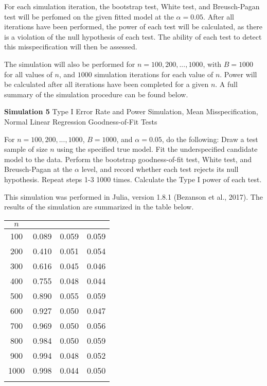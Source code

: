 		For each simulation iteration, the bootstrap test, White test, and Breusch-Pagan test will be perfomed on the given fitted model at the $\alpha = 0.05$. After all iterations have been
		performed, the power of each test will be calculated, as there is a violation of the null hypothesis of each test. The ability of each test to detect this misspecification will
		then be assessed.

		The simulation will also be performed for $n = 100,200,...,1000$, with $B = 1000$ for all values of $n$, and $1000$ simulation iterations for each value of $n$. 
		Power will be calculated after all iterations have been completed for a given $n$. A full summary of the simulation procedure can be found below.
		\begin{algorithm}[H]
			\caption*{\textbf{Simulation 5} Type I Error Rate and Power Simulation, Mean Misspecification, Normal Linear Regression Goodness-of-Fit Tests}
			\begin{algorithmic}[1]
			  \Statex For $n = 100,200,...,1000$, $B = 1000$, and $\alpha = 0.05$, do the following:
			  \State Draw a test sample of size $n$ using the specified true model.
			  \State Fit the underspecified candidate model to the data.
			  \State Perform the bootstrap goodness-of-fit test, White test, and Breusch-Pagan at the $\alpha$ level,
			  and record whether each test rejects its null hypothesis.
			  \State Repeat steps 1-3 1000 times.
			  \State Calculate the Type I power of each test.
			\end{algorithmic}
		\end{algorithm}

		This simulation was performed in Julia, version 1.8.1 (Bezanson et al., 2017). The results of the simulation are summarized in the table below.

		\begin{table}[H]
			\centering
			\small\addtolength{\tabcolsep}{-3pt}
			\setlength\extrarowheight{-3pt}
			{
			\begin{tabular}{ c|c|c|c}
			$n$ & \vtop{\hbox{\strut Bootstrap}\hbox{\strut Test}} & \vtop{\hbox{\strut White}\hbox{\strut Test}} & \vtop{\hbox{\strut Breusch-Pagan} \hbox{\strut Test}} \\
			 \hline
			 100 & 0.089 & 0.059 & 0.059 \\
			 200 & 0.410 & 0.051 & 0.054 \\
			 300 & 0.616 & 0.045 & 0.046 \\
			 400 & 0.755 & 0.048 & 0.044 \\
			 500 & 0.890 & 0.055 & 0.059 \\
			 600 & 0.927 & 0.050 & 0.047 \\
			 700 & 0.969 & 0.050 & 0.056 \\
			 800 & 0.984 & 0.050 & 0.059 \\
			 900 & 0.994 & 0.048 & 0.052 \\
			 1000 & 0.998 & 0.044 & 0.050 \\
			 
			 \Xhline{3\arrayrulewidth}
			\end{tabular}
			}
		\end{table}

